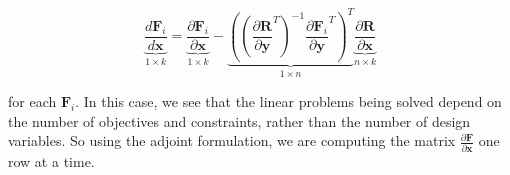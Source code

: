 \documentclass{article}
\begin{document}
$$\underbrace{\frac{d \mathbf F_i}{d \mathbf x}}_{1 \times k} =  \underbrace{\frac{\partial \mathbf F_i}{\partial \mathbf x}}_{1 \times k} - \underbrace{\left(\left(\frac{\partial \mathbf R}{\partial \mathbf y} ^T\right)^{-1} \frac{\partial \mathbf F_i}{\partial \mathbf y} ^T\right)^T}_{1 \times n} \underbrace{\frac{\partial \mathbf R}{\partial \mathbf x}}_{n \times k} $$

for each $\mathbf {F}_i$. In this case, we see that the linear problems being solved depend on the number of objectives and constraints, rather than the number of design variables. So using the adjoint formulation, we are computing the matrix $\frac{\partial \mathbf F}{\partial \mathbf x}$ one row at a time.
\end{document}
